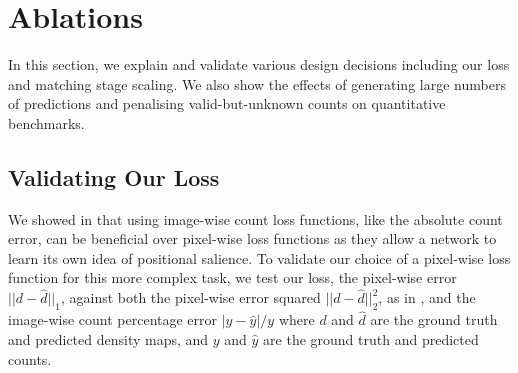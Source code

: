 \documentclass[../thesis.tex]{subfiles}
\begin{document}
\begin{table}
    \centering
    \resizebox{0.99\textwidth}{!}{%
    }
    \caption{Comparison to SOTA methods when trained on MCAC and applied to the cases in FSC147 with fewer than 300 objects. 
     Combining sub-class density maps with a sum rather than a max is more effective as it is more accurate in cases where instances of the sub classes are spatially close or overlapping as both instances are counted completely.
    CounTR \dag \enspace is an exemplar-free modification of CounTR.
    }
    \label{table__ABC123__FSC147_results_table}
\end{table}

\begin{table}
    \centering
   
    
    \caption{Comparison to the relevant SOTA methods when trained on MCAC and applied to the test set of FSCD-LVIS \cite{nguyen2022few}. 
     Combining sub-class density maps with a max operation.}
    \label{table__ABC123__FSCLVIS_results_table}
\end{table}

\section{Ablations}
In this section, we explain and validate various design decisions including our loss and matching stage scaling.
We also show the effects of generating large numbers of predictions and penalising valid-but-unknown counts on quantitative benchmarks.

\subsection{Validating Our Loss}\label{sec__ABC123__ablation_losses}
We showed in  that using image-wise count loss functions, like the absolute count error, can be beneficial over pixel-wise loss functions as they allow a network to learn its own idea of positional salience.
To validate our choice of a pixel-wise loss function for this more complex task, we test our loss, the pixel-wise error $||d - \hat{d}||_1$, against both the pixel-wise error squared $||d - \hat{d}||^2_2$, as in \cite{ranjan2021Famnet, liu2022countr, xu2023zsc}, and the image-wise count percentage error $|y - \hat{y}|/y$ where $d$ and $\hat{d}$ are the ground truth and predicted density maps, and  $y$ and $\hat{y}$ are the ground truth and predicted counts.
\end{document}
